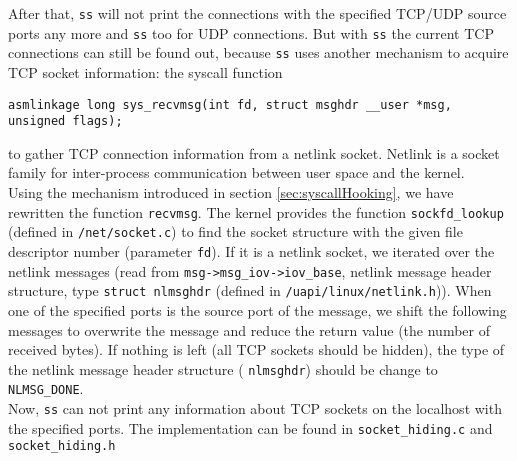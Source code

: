 After that, \texttt{ss} will not print the connections with the specified 
TCP/UDP source ports any more and \texttt{ss} too for UDP connections. But with \texttt{ss} the current TCP connections 
can still be found out, because \texttt{ss} uses another mechanism to acquire TCP 
socket information: the syscall function 
\lstset{escapechar=,style=customc}
\begin{lstlisting}
asmlinkage long sys_recvmsg(int fd, struct msghdr __user *msg, unsigned flags);
\end{lstlisting}
to gather TCP connection information from a netlink socket. Netlink is a socket 
family for inter-process communication between user space and the kernel.\\
Using the mechanism introduced in section \ref{sec:syscallHooking}, we have 
rewritten the function \verb+recvmsg+. The kernel provides the function 
\verb+sockfd_lookup+ (defined in \verb+/net/socket.c+) to find the socket 
structure with the given file descriptor number (parameter \verb+fd+). If it is 
a netlink socket, we iterated over the netlink messages (read from 
\verb+msg->msg_iov->iov_base+, netlink message header structure, type 
\verb+struct nlmsghdr+ (defined in \verb+/uapi/linux/netlink.h+)). When one 
of the specified ports is the source port of the message, we shift the following 
messages to overwrite the message and reduce the return value (the number of 
received bytes). If nothing is left (all TCP sockets should be hidden), the type 
of the netlink message header structure ( \verb+nlmsghdr+) should be change to 
\verb+NLMSG_DONE+. \\
Now, \texttt{ss} can not print any information about TCP sockets on the 
localhost with the specified ports. The implementation can be found in 
\verb+socket_hiding.c+ and \verb+socket_hiding.h+\\

